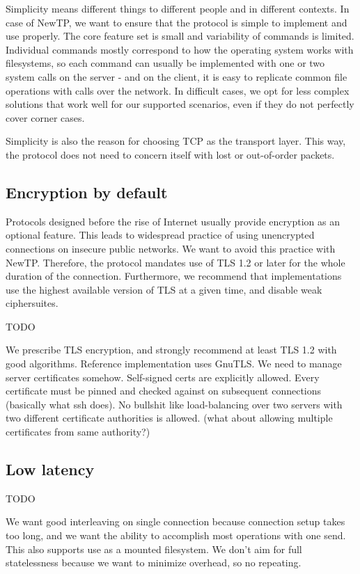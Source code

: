 Simplicity means different things to different people and in different contexts. In case of NewTP, we want to
ensure that the protocol is simple to implement and use properly. The core feature set is small and
variability of commands is limited. Individual commands mostly correspond to how the operating system works
with filesystems, so each command can usually be implemented with one or two system calls on the server - and
on the client, it is easy to replicate common file operations with calls over the network. In difficult cases,
we opt for less complex solutions that work well for our supported scenarios, even if they do not perfectly
cover corner cases.

Simplicity is also the reason for choosing TCP as the transport layer. This way, the protocol does not need to
concern itself with lost or out-of-order packets.

\subsection{Encryption by default}

Protocols designed before the rise of Internet usually provide encryption as an optional feature. This leads
to widespread practice of using unencrypted connections on insecure public networks. We want to avoid this
practice with NewTP. Therefore, the protocol mandates use of TLS 1.2 or later for the whole duration of the
connection.  Furthermore, we recommend that implementations use the highest available version of TLS at
a given time, and disable weak ciphersuites.

TODO

We prescribe TLS encryption, and strongly recommend at least TLS 1.2 with good algorithms. Reference
implementation uses GnuTLS. We need to manage server certificates somehow. Self-signed certs are explicitly
allowed. Every certificate must be pinned and checked against on subsequent connections (basically what ssh
does). No bullshit like load-balancing over two servers with two different certificate authorities is allowed.
(what about allowing multiple certificates from same authority?)

\subsection{Low latency}

TODO

We want good interleaving on single connection because connection setup takes too long, and we want the
ability to accomplish most operations with one send. This also supports use as a mounted filesystem. We don't
aim for full statelessness because we want to minimize overhead, so no repeating.

